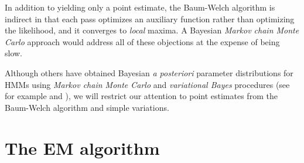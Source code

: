 In addition to yielding only a point estimate, the Baum-Welch
algorithm is indirect in that each pass optimizes an auxiliary
function rather than optimizing the likelihood, and it converges to
\emph{local} maxima.  A Bayesian \emph{Markov chain Monte Carlo}
approach would address all of these objections at the expense of being
slow.

Although others have obtained Bayesian \emph{a posteriori} parameter
distributions for HMMs using \emph{Markov chain Monte Carlo} and
\emph{variational Bayes} procedures (see for example \cite{Rosales04}
and \cite{Beal03}), we will restrict our attention to point estimates
from the Baum-Welch algorithm and simple variations.


\section{The EM algorithm}
\label{sec:EM}
%
%

